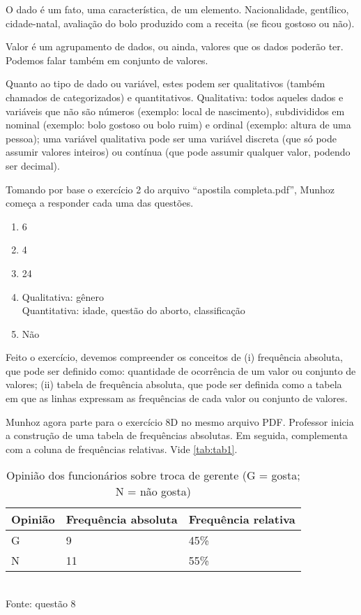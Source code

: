\documentclass[a4paper]{article}
\begin{document}
	O dado é um fato, uma característica, de um elemento. Nacionalidade, gentílico, cidade-natal, avaliação do bolo produzido com a receita (se ficou gostoso ou não).
	
	Valor é um agrupamento de dados, ou ainda, valores que os dados poderão ter. Podemos falar também em conjunto de valores.
	
	Quanto ao tipo de dado ou variável, estes podem ser qualitativos (também chamados de categorizados) e quantitativos. Qualitativa: todos aqueles dados e variáveis que não são números (exemplo: local de nascimento), subdivididos em nominal (exemplo: bolo gostoso ou bolo ruim) e ordinal (exemplo: altura de uma pessoa); uma variável qualitativa pode ser uma variável discreta (que só pode assumir valores inteiros) ou contínua (que pode assumir qualquer valor, podendo ser decimal).
	
	Tomando por base o exercício 2 do arquivo ``apostila completa.pdf'', Munhoz começa a responder cada uma das questões.
	
	\begin{enumerate}[label=\alph*.]
		\item 6
		\item 4
		\item 24
		\item Qualitativa: gênero\\ Quantitativa: idade, questão do aborto, classificação
		\item Não
	\end{enumerate}
	
	Feito o exercício, devemos compreender os conceitos de (i) frequência absoluta, que pode ser definido como: quantidade de ocorrência de um valor ou conjunto de valores; (ii) tabela de frequência absoluta, que pode ser definida como a tabela em que as linhas expressam as frequências de cada valor ou conjunto de valores.
	
	Munhoz agora parte para o exercício 8D no mesmo arquivo PDF. Professor inicia a construção de uma tabela de frequências absolutas. Em seguida, complementa com a coluna de frequências relativas. Vide \autoref{tab:tab1}.
	
	\begin{table}[]
		\centering
		\caption{Opinião dos funcionários sobre troca de gerente (G = gosta; N = não gosta)}
		\begin{tabular}{|l|l|l|}
			\hline
			\textbf{Opinião} & \textbf{Frequência absoluta} & \textbf{Frequência relativa} \\ \hline
			G & 9 & 45\% \\ \hline
			N & 11 & 55\% \\ \hline
		\end{tabular}
		\\ \vspace{1mm} Fonte: questão 8
		\label{tab:tab1}
	\end{table}
	
\end{document}
